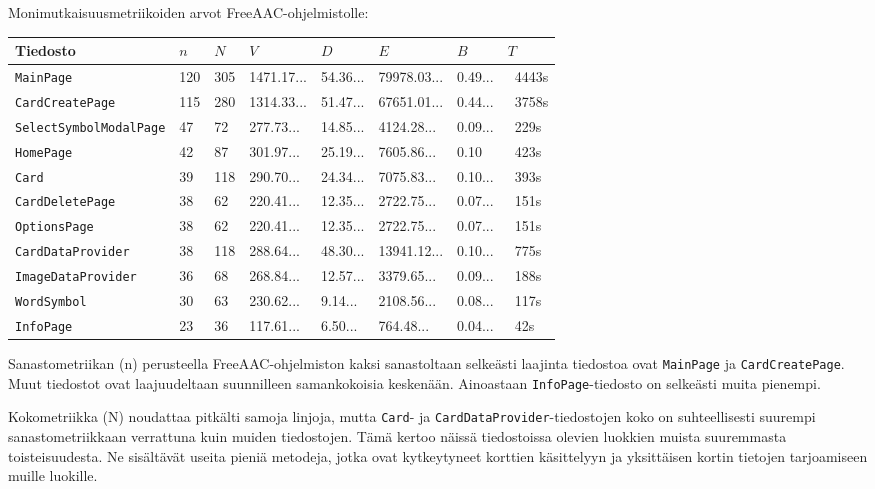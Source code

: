 \documentclass[utf8]{gradu3}
\begin{document}
\newpage
Monimutkaisuusmetriikoiden arvot FreeAAC-ohjelmistolle:

\begin{center}
    \begin{tabular}{| l | l | l | l | l | l | l | l |}
    \hline
    \textbf{Tiedosto} & \textbf{$n$} & \textbf{$N$} & \textbf{$V$} & \textbf{$D$} & \textbf{$E$} & \textbf{$B$} & \textbf{$T$} \\ \hline
    \texttt{MainPage} & 120 & 305 & 1471.17... & 54.36... & 79978.03... & 0.49... & ~4443s  \\ \hline
    \texttt{CardCreatePage} & 115 & 280 & 1314.33... & 51.47... & 67651.01... & 0.44... & ~3758s \\ \hline
    \texttt{SelectSymbolModalPage} & 47 & 72 & 277.73... & 14.85... & 4124.28... & 0.09... & ~229s \\ \hline
    \texttt{HomePage} & 42 & 87 & 301.97... & 25.19... & 7605.86... & 0.10 & ~423s \\ \hline
    \texttt{Card} & 39 & 118 & 290.70... & 24.34... & 7075.83... & 0.10... & ~393s  \\ \hline
    \texttt{CardDeletePage} & 38 & 62 & 220.41... & 12.35... & 2722.75... & 0.07... & ~151s   \\ \hline
    \texttt{OptionsPage} & 38 & 62 & 220.41... & 12.35... & 2722.75... & 0.07... & ~151s  \\ \hline
    \texttt{CardDataProvider} & 38 & 118 & 288.64... & 48.30... & 13941.12... & 0.10... & ~775s  \\ \hline
    \texttt{ImageDataProvider} & 36 & 68 & 268.84... & 12.57... & 3379.65... & 0.09... & ~188s \\ \hline
    \texttt{WordSymbol} & 30 & 63 & 230.62... & 9.14... & 2108.56... & 0.08... & ~117s  \\ \hline
    \texttt{InfoPage} & 23 & 36 & 117.61... & 6.50... & 764.48... & 0.04... & ~42s  \\ \hline
    \end{tabular}
\end{center}

Sanastometriikan (n) perusteella FreeAAC-ohjelmiston kaksi sanastoltaan selkeästi laajinta tiedostoa ovat \texttt{MainPage} ja \texttt{CardCreatePage}. Muut tiedostot ovat laajuudeltaan suunnilleen samankokoisia keskenään. Ainoastaan \texttt{InfoPage}-tiedosto on selkeästi muita pienempi.

Kokometriikka (N) noudattaa pitkälti samoja linjoja, mutta \texttt{Card}- ja \texttt{CardDataProvider}-tiedostojen koko on suhteellisesti suurempi sanastometriikkaan verrattuna kuin muiden tiedostojen. Tämä kertoo näissä tiedostoissa olevien luokkien muista suuremmasta toisteisuudesta. Ne sisältävät useita pieniä metodeja, jotka ovat kytkeytyneet korttien käsittelyyn ja yksittäisen kortin tietojen tarjoamiseen muille luokille.
\end{document}
